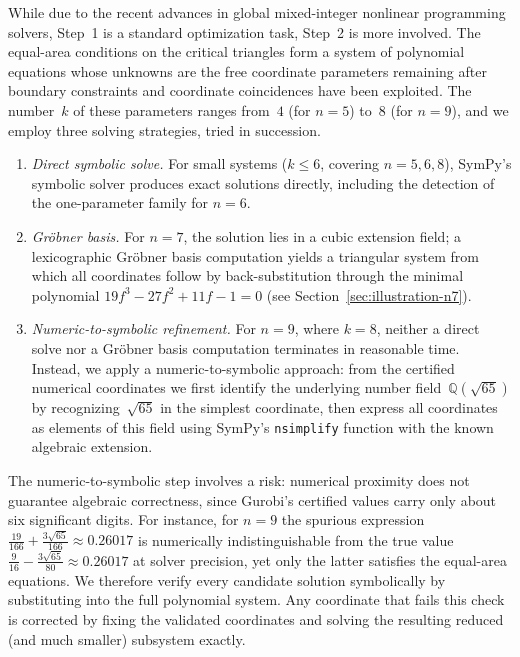 \documentclass[11pt,a4paper]{article}
\theoremstyle{plain}
\theoremstyle{definition}
\theoremstyle{remark}
\begin{document}
While due to the recent advances in global mixed-integer nonlinear programming solvers, Step~1 is a standard optimization task, Step~2 is more involved.
The equal-area conditions on the critical triangles form a system of polynomial equations whose unknowns are the free coordinate parameters remaining after boundary constraints and coordinate coincidences have been exploited.
The number~$k$ of these parameters ranges from~$4$ (for $n=5$) to~$8$ (for $n=9$), and we employ three solving strategies, tried in succession.

\begin{enumerate}
\item \emph{Direct symbolic solve.}
For small systems ($k \le 6$, covering $n=5,6,8$), SymPy's symbolic solver produces exact solutions directly, including the detection of the one-parameter family for $n=6$.
\item \emph{Gröbner basis.}
For $n=7$, the solution lies in a cubic extension field; a lexicographic Gröbner basis computation
yields a triangular system from which all coordinates follow by back-substitution through the minimal polynomial $19f^3 - 27f^2 + 11f - 1 = 0$ (see Section~\ref{sec:illustration-n7}).
\item \emph{Numeric-to-symbolic refinement.}
For $n=9$, where $k=8$, neither a direct solve nor a Gröbner basis computation terminates in reasonable time.
Instead, we apply a numeric-to-symbolic approach: from the certified numerical coordinates we first identify the underlying number field~$\mathbb{Q}(\sqrt{65})$ by recognizing~$\sqrt{65}$ in the simplest coordinate, then express all coordinates as elements of this field using SymPy's \texttt{nsimplify} function with the known algebraic extension.
\end{enumerate}

\noindent
The numeric-to-symbolic step involves a risk:
numerical proximity does not guarantee algebraic correctness, since Gurobi's certified values carry only about six significant digits.
For instance, for $n=9$ the spurious expression $\tfrac{19}{166} + \tfrac{3\sqrt{65}}{166} \approx 0.26017$
is numerically indistinguishable from the true value $\tfrac{9}{16} - \tfrac{3\sqrt{65}}{80} \approx 0.26017$
at solver precision, yet only the latter satisfies the equal-area equations.
We therefore verify every candidate solution symbolically by substituting into the full polynomial system.
Any coordinate that fails this check is corrected by fixing the validated coordinates and solving the resulting reduced (and much smaller) subsystem exactly.
\end{document}
